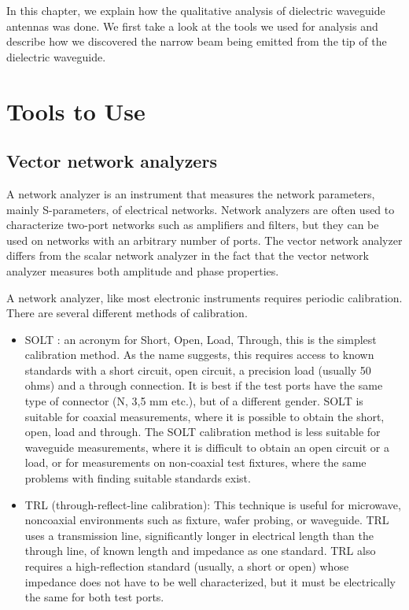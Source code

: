 \documentclass[a4paper,12pt]{report}
\begin{document}
In this chapter,
we explain how the qualitative analysis of
dielectric waveguide antennas was done.
We first take a look at the tools we used for analysis and
describe how we discovered
the narrow beam being emitted from the tip of the dielectric waveguide.

\section{Tools to Use}

\subsection{Vector network analyzers}

A network analyzer is an instrument that measures the
network parameters, mainly S-parameters, of electrical networks.
Network analyzers are often used to characterize two-port networks
such as amplifiers and filters,
but they can be used on networks with an arbitrary number of ports.
The vector network analyzer differs from the scalar network analyzer
in the fact that the
vector network analyzer measures both amplitude and phase properties.

A network analyzer, like most electronic instruments requires periodic calibration.
There are several different methods of calibration.

\begin{itemize}
  \item SOLT : an acronym for Short, Open, Load, Through,
  this is the simplest calibration method. As the name suggests,
  this requires access to known standards with a short circuit, open circuit,
  a precision load (usually 50 ohms) and a through connection.
  It is best if the test ports have the same type of connector (N, 3,5 mm etc.),
  but of a different gender.
  SOLT is suitable for coaxial measurements,
  where it is possible to obtain the short, open, load and through.
  The SOLT calibration method is less suitable for waveguide measurements,
  where it is difficult to obtain an open circuit or a load,
  or for measurements on non-coaxial test fixtures,
  where the same problems with finding suitable standards exist.
  \item TRL (through-reflect-line calibration):
  This technique is useful for microwave, noncoaxial environments such as fixture,
  wafer probing, or waveguide.
  TRL uses a transmission line,
  significantly longer in electrical length than the through line,
  of known length and impedance as one standard.
  TRL also requires a high-reflection standard (usually, a short or open)
  whose impedance does not have to be well characterized,
  but it must be electrically the same for both test ports.
\end{itemize}
\end{document}
